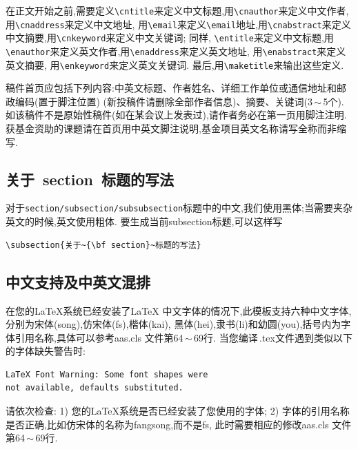 \documentclass[fontset=mac]{aas}
\begin{document}
在正文开始之前,需要定义\verb|\cntitle|来定义中文标题,用\verb|\cnauthor|来定义中文作者,用\verb|\cnaddress|来定义中文地址,
用\verb|\email|来定义\verb|\email|地址,用\verb|\cnabstract|来定义中文摘要,用\verb|\cnkeyword|来定义中文关键词;
同样, \verb|\entitle|来定义中文标题,用\verb|\enauthor|来定义英文作者,用\verb|\enaddress|来定义英文地址,
用\verb|\enabstract|来定义英文摘要,
用\verb|\enkeyword|来定义英文关键词.
最后,用\verb|\maketitle|来输出这些定义.

稿件首页应包括下列内容:中英文标题、作者姓名、详细工作单位或通信地址和邮政编码(置于脚注位置)
(新投稿件请删除全部作者信息)、摘要、关键词(3\,$\sim$\,5个).
如该稿件不是原始性稿件(如在某会议上发表过),请作者务必在第一页用脚注注明.
获基金资助的课题请在首页用中英文脚注说明,基金项目英文名称请写全称而非缩写.

\subsection{关于~{\bf section}~标题的写法}
对于\verb|section/subsection/subsubsection|标题中的中文,我们使用黑体;当需要夹杂英文的时候,英文使用粗体.
要生成当前subsection标题,可以这样写
\begin{verbatim}
\subsection{关于~{\bf section}~标题的写法}
\end{verbatim}

 

\subsection{中文支持及中英文混排}
在您的\LaTeX 系统已经安装了\LaTeX
中文字体的情况下,此模板支持六种中文字体,分别为宋体(song),仿宋体(fs),楷体(kai),
黑体(hei),隶书(li)和幼圆(you),括号内为字体引用名称,具体可以参考aas.cls
文件第64\,$\sim$\,69行. 当您编译\,.tex文件遇到类似以下的字体缺失警告时:



\balance



\begin{verbatim}
LaTeX Font Warning: Some font shapes were
not available, defaults substituted.
\end{verbatim}
请依次检查: 1) 您的\LaTeX 系统是否已经安装了您使用的字体; 2)
字体的引用名称是否正确,比如仿宋体的名称为fangsong,而不是fs,
此时需要相应的修改aas.cls 文件第64\,$\sim$\,69行.
\end{document}
